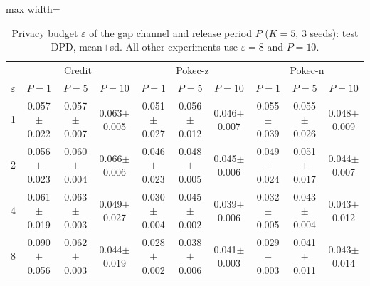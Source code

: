 \begin{table}[tbp]
\centering
\scriptsize
\setlength{\tabcolsep}{3pt}
\caption{Privacy budget $\varepsilon$ of the gap channel and release period $P$ ($K=5$, 3 seeds): test DPD, mean$\pm$sd. All other experiments use $\varepsilon=8$ and $P=10$.}
\label{tab:e5}
\begin{adjustbox}{max width=\textwidth}
\begin{tabular}{cccccccccc}
\toprule
 & \multicolumn{3}{c}{Credit} & \multicolumn{3}{c}{Pokec-z} & \multicolumn{3}{c}{Pokec-n} \\
$\varepsilon$ & $P=1$ & $P=5$ & $P=10$ & $P=1$ & $P=5$ & $P=10$ & $P=1$ & $P=5$ & $P=10$ \\
\midrule
1 & 0.057$\pm$0.022 & 0.057$\pm$0.007 & 0.063$\pm$0.005 & 0.051$\pm$0.027 & 0.056$\pm$0.012 & 0.046$\pm$0.007 & 0.055$\pm$0.039 & 0.055$\pm$0.026 & 0.048$\pm$0.009 \\
2 & 0.056$\pm$0.023 & 0.060$\pm$0.004 & 0.066$\pm$0.006 & 0.046$\pm$0.023 & 0.048$\pm$0.005 & 0.045$\pm$0.006 & 0.049$\pm$0.024 & 0.051$\pm$0.017 & 0.044$\pm$0.007 \\
4 & 0.061$\pm$0.019 & 0.063$\pm$0.003 & 0.049$\pm$0.027 & 0.030$\pm$0.004 & 0.045$\pm$0.002 & 0.039$\pm$0.006 & 0.032$\pm$0.005 & 0.043$\pm$0.004 & 0.043$\pm$0.012 \\
8 & 0.090$\pm$0.056 & 0.062$\pm$0.003 & 0.044$\pm$0.019 & 0.028$\pm$0.002 & 0.038$\pm$0.006 & 0.041$\pm$0.003 & 0.029$\pm$0.003 & 0.041$\pm$0.011 & 0.043$\pm$0.014 \\
\bottomrule
\end{tabular}
\end{adjustbox}
\end{table}
